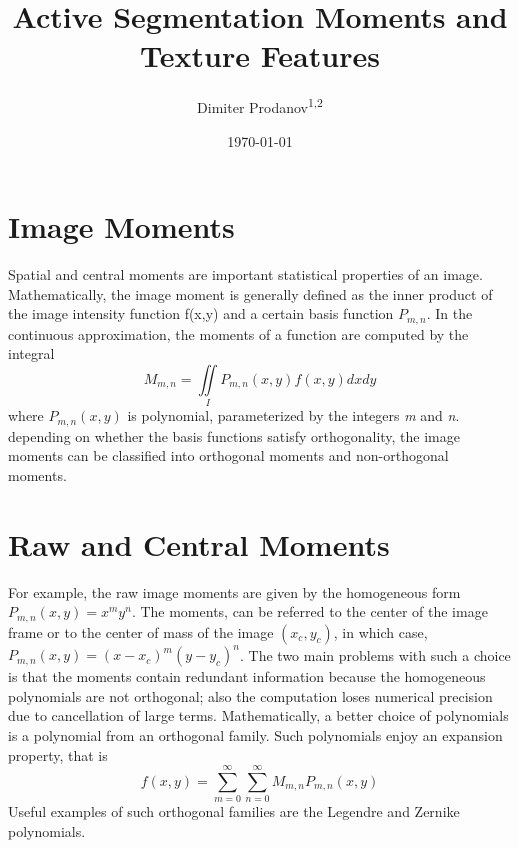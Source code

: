 \documentclass{amsart}
\title{Active Segmentation Moments and Texture Features}
\author{Dimiter Prodanov\textsuperscript{1,2} }
\begin{document}
\date{\today}	
\maketitle
\tableofcontents

 \section{Image Moments}\label{sec:immom}
 
 Spatial and central moments are important statistical properties of an image. 
 Mathematically, the image moment is generally defined as the inner product  of the image intensity function f(x,y) and a certain basis function $ P_{m,n}$.  
 In the continuous approximation, the moments of a function are computed by the integral
 \[
 M_{m,n}   = \iint\limits_{I} P_{m,n}(x,y) f(x,y) dx dy
 \]
 where $ P_{m,n}(x,y)$ is polynomial, parameterized by the integers \textit{m} and \textit{n}.   
  depending on whether the basis functions satisfy orthogonality, the image moments can
 be classified into orthogonal moments and non-orthogonal moments.
 
 \section{Raw and Central Moments}\label{sec:rawmom}
 For example, the raw image moments are given by the homogeneous form $P_{m,n}(x,y)= x^m y^n$.
 The moments, can be referred to the center of the image frame or to the center of mass of the image $(x_c, y_c)$, 
 in which case,   $P_{m,n}(x,y) = (x-x_c)^m (y-y_c)^n$.
 The two main problems with such a choice is that the moments contain redundant information because the homogeneous polynomials are not orthogonal; 
 also the computation loses numerical precision due to cancellation of large terms. 
 Mathematically, a better choice of  polynomials is a polynomial from an orthogonal  family. 
 Such polynomials enjoy an expansion property, that is 
 \[
 f(x,y) = \sum_{m=0}^{\infty} \sum_{n=0}^{\infty} M_{m,n} P_{m,n}(x,y)
 \]
 Useful examples of such orthogonal families are the Legendre and Zernike polynomials.

\end{document}
